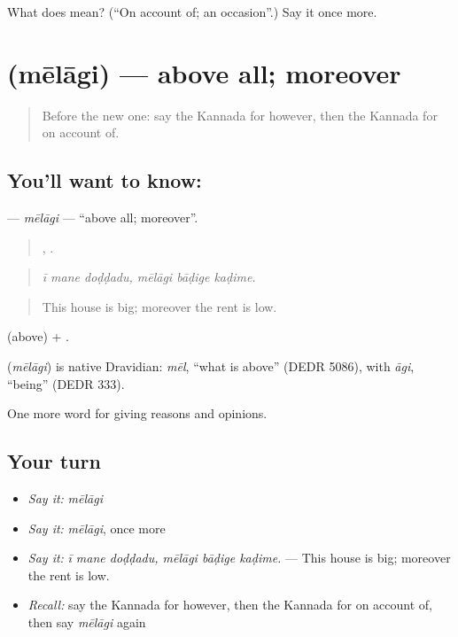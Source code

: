 \begin{tcolorbox}[breakable,colback=teal!4,colframe=teal!35!black,title={Before you move on}]
What does  mean? (\textquotedblleft{}On account of; an occasion\textquotedblright{}.) Say it once more.
\end{tcolorbox}
\section[\texorpdfstring{\kn{ಮೇಲಾಗಿ} (mēlāgi)}{ಮೇಲಾಗಿ (mēlāgi)}]{ (mēlāgi) — above all; moreover}

\label{lesson:KA-C410-melagi}



\begin{quote}
Before the new one: say the Kannada for however, then the Kannada for on account of.
\end{quote}

\subsection*{You'll want to know: }
\textbf{} — \emph{mēlāgi} — \textquotedblleft{}above all; moreover\textquotedblright{}.

\begin{quote}
  ,   .
\end{quote}

\begin{quote}
\emph{ī mane doḍḍadu, mēlāgi bāḍige kaḍime.}
\end{quote}

\begin{quote}
This house is big; moreover the rent is low.
\end{quote}

 (above) + .

\begin{cousinweb}
\textbf{} (\emph{mēlāgi}) is native Dravidian: \emph{mēl}, \textquotedblleft{}what is above\textquotedblright{} (DEDR 5086), with \emph{āgi}, \textquotedblleft{}being\textquotedblright{} (DEDR 333).
\end{cousinweb}

\begin{grammarlens}[title={What you've built}]
One more word for giving reasons and opinions.
\end{grammarlens}

\subsection*{Your turn}
\begin{itemize}
\raggedright
  \item \emph{Say it:} \emph{mēlāgi}
  \item \emph{Say it:} \emph{mēlāgi}, once more
  \item \emph{Say it:} \emph{ī mane doḍḍadu, mēlāgi bāḍige kaḍime.} — This house is big; moreover the rent is low.
  \item \emph{Recall:} say the Kannada for however, then the Kannada for on account of, then say \emph{mēlāgi} again
\end{itemize}

